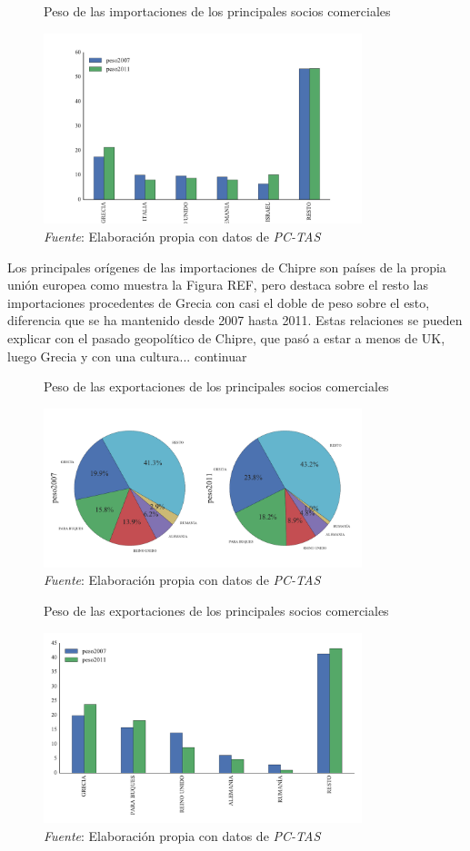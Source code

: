 \documentclass[a4paper,openright,12pt]{book}
\begin{document}
\begin{figure}[ht]
    \centering
    \caption{Peso de las importaciones de los principales socios comerciales}
    \includegraphics[width=350px]{bar_mgeo.pdf}
    \caption*{\textit{Fuente}: Elaboración propia con datos de \textit{PC-TAS}}
    \label{bar_mgeo}
\end{figure}

Los principales orígenes de las importaciones de Chipre son países de la propia unión europea como muestra la Figura REF, pero destaca sobre el resto las importaciones procedentes de Grecia con casi el doble de peso sobre el esto, diferencia que se ha mantenido desde 2007 hasta 2011.
Estas relaciones se pueden explicar con el pasado geopolítico de Chipre, que pasó a estar a menos de UK, luego Grecia y con una cultura... continuar

\begin{figure}[ht]
    \centering
    \caption{Peso de las exportaciones de los principales socios comerciales}
    \includegraphics[width=350px]{pie_xgeo.pdf}
    \caption*{\textit{Fuente}: Elaboración propia con datos de \textit{PC-TAS}}
    \label{pie_xgeo}
\end{figure}

\begin{figure}[tbh]
    \centering
    \caption{Peso de las exportaciones de los principales socios comerciales}
    \includegraphics[width=350px]{bar_xgeo.pdf}
    \caption*{\textit{Fuente}: Elaboración propia con datos de \textit{PC-TAS}}
    \label{bar_xgeo}
\end{figure}
\end{document}
